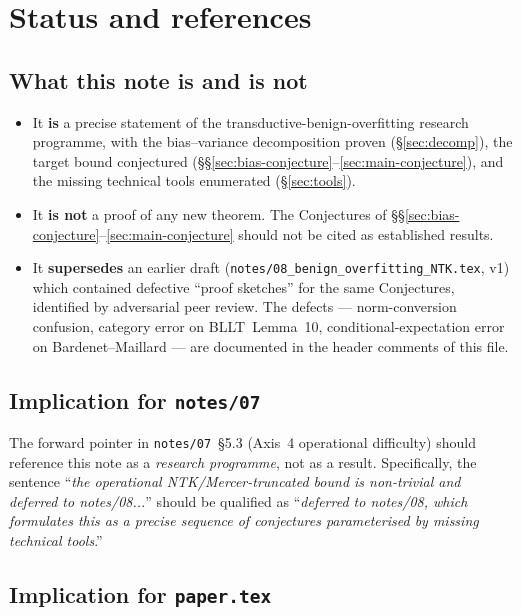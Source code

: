 \documentclass[11pt,a4paper]{article}
\theoremstyle{plain}
\theoremstyle{definition}
\theoremstyle{remark}
\begin{document}
\section{Status and references}
\label{sec:status}

\subsection{What this note is and is not}

\begin{itemize}[label=$\bullet$,leftmargin=*]
\item It \textbf{is} a precise statement of the
    transductive-benign-overfitting research programme, with the
    bias--variance decomposition proven (\S\ref{sec:decomp}), the
    target bound conjectured (\S\S\ref{sec:bias-conjecture}--\ref{sec:main-conjecture}),
    and the missing technical tools enumerated (\S\ref{sec:tools}).
\item It \textbf{is not} a proof of any new theorem. The
    Conjectures of \S\S\ref{sec:bias-conjecture}--\ref{sec:main-conjecture}
    should not be cited as established results.
\item It \textbf{supersedes} an earlier draft
    (\texttt{notes/08\_benign\_overfitting\_NTK.tex}, v1) which
    contained defective ``proof sketches'' for the same
    Conjectures, identified by adversarial peer review. The
    defects --- norm-conversion confusion, category error on
    BLLT~Lemma~10, conditional-expectation error on Bardenet--Maillard
    --- are documented in the header comments of this file.
\end{itemize}

\subsection{Implication for \texttt{notes/07}}

The forward pointer in \texttt{notes/07}~\S5.3 (Axis~4 operational
difficulty) should reference this note as a \emph{research
programme}, not as a result. Specifically, the sentence
``\emph{the operational NTK/Mercer-truncated bound is non-trivial
and deferred to notes/08...}'' should be qualified as
``\emph{deferred to notes/08, which formulates this as a precise
sequence of conjectures parameterised by missing technical tools}.''

\subsection{Implication for \texttt{paper.tex}}
\end{document}
